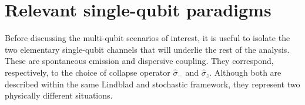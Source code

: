 \section{Relevant single-qubit paradigms}
\label{sec:relevant_single_qubit_paradigms}

Before discussing the multi-qubit scenarios of interest, it is useful to isolate the two elementary single-qubit channels that will underlie the rest of the analysis. These are spontaneous emission and dispersive coupling. They correspond, respectively, to the choice of collapse operator \(\hat \sigma_-\) and \(\hat \sigma_z\). Although both are described within the same Lindblad and stochastic framework, they represent two physically different situations.


